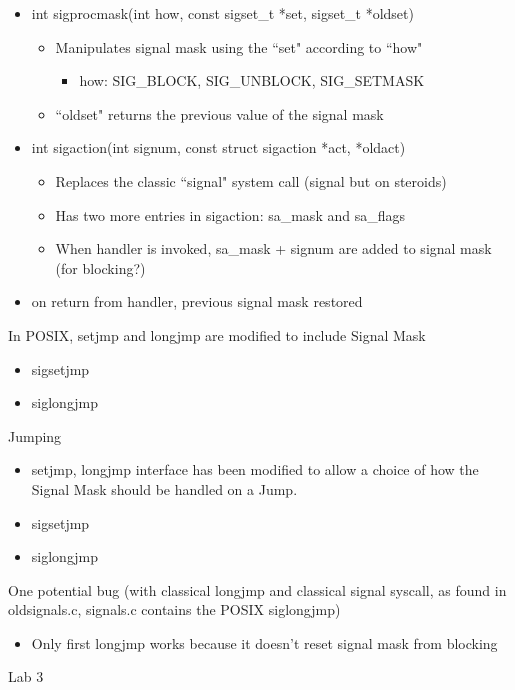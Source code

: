 \begin{itemize}
    \item int sigprocmask(int how, const sigset\_t *set, sigset\_t *oldset)
    \begin{itemize}
        \item Manipulates signal mask using the ``set" according to ``how"
        \begin{itemize}
            \item how: SIG\_BLOCK, SIG\_UNBLOCK, SIG\_SETMASK
        \end{itemize}
        \item ``oldset" returns the previous value of the signal mask
    \end{itemize}
    \item int sigaction(int signum, const struct sigaction *act, *oldact)
    \begin{itemize}
        \item Replaces the classic ``signal" system call (signal but on steroids)
        \item Has two more entries in sigaction: sa\_mask and sa\_flags
        \item When handler is invoked, sa\_mask + signum are added to signal mask (for blocking?)
    \end{itemize}
    \item on return from handler, previous signal mask restored
\end{itemize}
In POSIX, setjmp and longjmp are modified to include Signal Mask
\begin{itemize}
    \item sigsetjmp
    \item siglongjmp
\end{itemize}
Jumping
\begin{itemize}
    \item setjmp, longjmp interface has been modified to allow a 
    choice of how the Signal Mask should be handled on a Jump.
    \item sigsetjmp
    \item siglongjmp
\end{itemize}
One potential bug (with classical longjmp and classical signal syscall, as found in oldsignals.c, signals.c contains the POSIX siglongjmp)
\begin{itemize}
    \item Only first longjmp works because it doesn't reset signal mask from blocking
\end{itemize}
Lab 3
